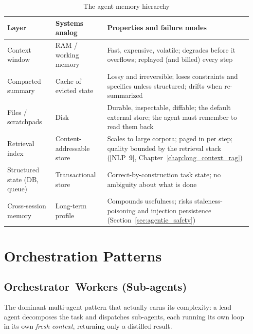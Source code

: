 \begin{table}[H]
\centering
\caption{The agent memory hierarchy}
\label{tab:agent_memory_hierarchy}
\begin{tabularx}{\textwidth}{p{2.9cm}p{3.3cm}X}
\toprule
\textbf{Layer} & \textbf{Systems analog} & \textbf{Properties and failure modes} \\
\midrule
Context window & RAM / working memory & Fast, expensive, volatile; degrades before it overflows; replayed (and billed) every step \\
Compacted summary & Cache of evicted state & Lossy and irreversible; loses constraints and specifics unless structured; drifts when re-summarized \\
Files / scratchpads & Disk & Durable, inspectable, diffable; the default external store; the agent must remember to read them back \\
Retrieval index & Content-addressable store & Scales to large corpora; paged in per step; quality bounded by the retrieval stack ([NLP~9], Chapter~\ref{chap:long_context_rag}) \\
Structured state (DB, queue) & Transactional store & Correct-by-construction task state; no ambiguity about what is done \\
Cross-session memory & Long-term profile & Compounds usefulness; risks staleness-poisoning and injection persistence (Section~\ref{sec:agentic_safety}) \\
\bottomrule
\end{tabularx}
\end{table}

\section{Orchestration Patterns}
\label{sec:agent_orchestration}

\subsection{Orchestrator--Workers (Sub-agents)}

The dominant multi-agent pattern that actually earns its complexity: a lead agent decomposes the task and dispatches sub-agents, each running its own loop in its own \textit{fresh context}, returning only a distilled result.

